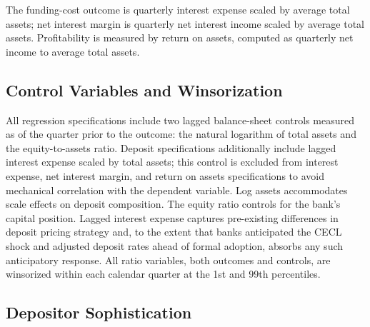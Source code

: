 The funding-cost outcome is quarterly interest expense scaled by average total
assets; net interest margin is quarterly net interest income scaled by average
total assets. Profitability is measured by return on assets, computed as
quarterly net income to average total assets.

\subsection{Control Variables and Winsorization}
\label{sec:data:controls}

All regression specifications include two lagged balance-sheet controls measured
as of the quarter prior to the outcome: the natural logarithm of total assets
and the equity-to-assets ratio. Deposit specifications additionally include lagged interest expense scaled by
total assets; this control is excluded from interest expense, net interest
margin, and return on assets specifications to avoid mechanical correlation with
the dependent variable. Log assets accommodates scale effects on deposit composition. The
equity ratio controls for the bank's capital position. Lagged interest
expense captures pre-existing differences in deposit pricing strategy and, to the
extent that banks anticipated the CECL shock and adjusted deposit rates ahead of
formal adoption, absorbs any such anticipatory response. All ratio variables, both
outcomes and controls, are winsorized within each calendar quarter at the 1st and
99th percentiles.

\subsection{Depositor Sophistication}
\label{sec:data:sophistication}

